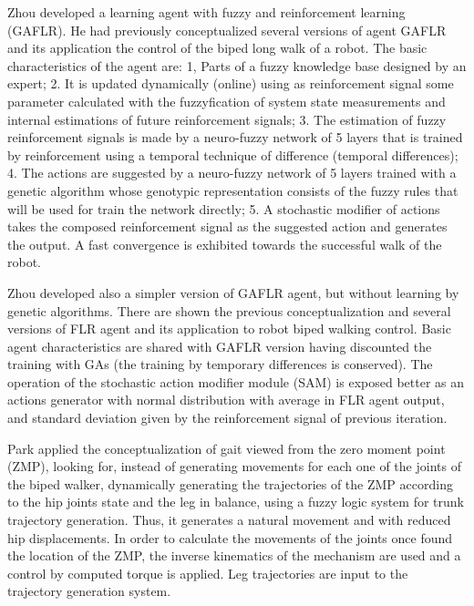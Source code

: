 Zhou \cite{Zhou02Robot} developed a learning agent with fuzzy and
reinforcement learning (GAFLR). He had previously conceptualized
several versions of agent GAFLR and its application the control of the
biped long walk of a robot. The basic characteristics of the agent
are: 1, Parts of a fuzzy knowledge base designed by an expert; 2. It
is updated dynamically (online) using as reinforcement signal some
parameter calculated with the fuzzyfication of system state
measurements and internal estimations of future reinforcement signals;
3. The estimation of fuzzy reinforcement signals is made by a
neuro-fuzzy network of 5 layers that is trained by reinforcement using
a temporal technique of difference (temporal differences); 4. The
actions are suggested by a neuro-fuzzy network of 5 layers trained
with a genetic algorithm whose genotypic representation consists of
the fuzzy rules that will be used for train the network directly; 5. A
stochastic modifier of actions takes the composed reinforcement signal
as the suggested action and generates the output. A fast convergence
is exhibited towards the successful walk of the robot.


Zhou \cite{Zhou03Dynamic} developed also a simpler version of GAFLR
agent, but without learning by genetic algorithms. There are shown the
previous conceptualization and several versions of FLR agent and its
application to robot biped walking control. Basic agent
characteristics are shared with GAFLR version having discounted the
training with GAs (the training by temporary differences is
conserved). The operation of the stochastic action modifier module
(SAM) is exposed better as an actions generator with normal
distribution with average in FLR agent output, and standard deviation
given by the reinforcement signal of previous iteration.


Park \cite{Park03Fuzzy-logic} applied the conceptualization of gait
viewed from the zero moment point (ZMP), looking for, instead of
generating movements for each one of the joints of the biped walker,
dynamically generating the trajectories of the ZMP according to the
hip joints state and the leg in balance, using a fuzzy logic system
for trunk trajectory generation. Thus, it generates a natural movement
and with reduced hip displacements. In order to calculate the
movements of the joints once found the location of the ZMP, the
inverse kinematics of the mechanism are used and a control by computed
torque is applied. Leg trajectories are input to the trajectory
generation system.



